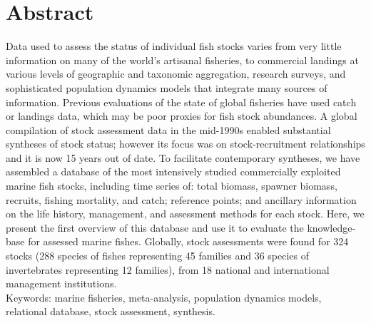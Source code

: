 \section*{Abstract}

Data used to assess the status of individual fish stocks varies from
very little information on many of the world's artisanal fisheries, to
commercial landings at various levels of geographic and taxonomic
aggregation, research surveys, and sophisticated population dynamics
models that integrate many sources of information.  Previous
evaluations of the state of global fisheries have used catch or
landings data, which may be poor proxies for fish stock abundances. A
global compilation of stock assessment data in the mid-1990s enabled
substantial syntheses of stock status; however its focus was on
stock-recruitment relationships and it is now 15 years out of date. To
facilitate contemporary syntheses, we have assembled a database of the
most intensively studied commercially exploited marine fish stocks,
including time series of: total biomass, spawner biomass, recruits,
fishing mortality, and catch; reference points; and ancillary
information on the life history, management, and assessment methods
for each stock.  Here, we present the first overview of this database
and use it to evaluate the knowledge-base for assessed marine fishes.
Globally, stock assessments were found for 324
stocks (288 species of fishes representing
45 families and 36
species of invertebrates representing 12
families), from 18 national and international
management institutions. \\

\noindent Keywords: marine fisheries, meta-analysis, population dynamics models, relational database, stock assessment, synthesis.


